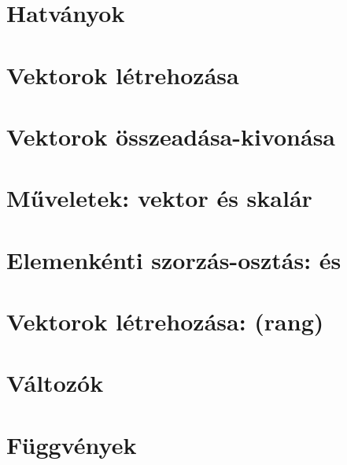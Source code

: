 \begin{spacing}{1.2}
\section*{Hatványok} \label{DBmatlabia5Mo}
\Mo{

}
\vspace{0.5cm}
\newpage
\section*{Vektorok létrehozása} \label{DBmatlabia6}
\Desc{

}
\vspace{0.5cm}
\newpage
\section*{Vektorok összeadása-kivonása} \label{DBmatlabia6s}
\Desc{

}
\vspace{0.5cm}
\newpage
\section*{Műveletek: vektor és skalár} \label{DBmatlabia7}
\Desc{

}
\vspace{0.5cm}
\newpage
\section*{Elemenkénti szorzás-osztás:  és } \label{DBmatlabia8}
\Desc{

}
\vspace{0.5cm}
\newpage
\section*{Vektorok létrehozása: \mcode{:} (rang)} \label{DBmatlabia9}
\Desc{

}
\vspace{0.5cm}
\newpage
\section*{Változók} \label{DBmatlabia10}
\Desc{

}
\vspace{0.5cm}
\newpage
\section*{Függvények} \label{DBmatlabia11}
\Desc{

}
\vspace{0.5cm}
\newpage

\end{spacing}
